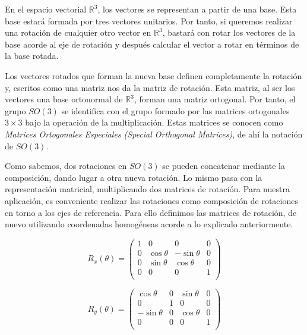 En el espacio vectorial $\mathbb{R}^3$, los vectores se representan a partir de
una base. Esta base estará formada por tres vectores unitarios. Por tanto, si
queremos realizar una rotación de cualquier otro vector en $\mathbb{R}^3$,
bastará con rotar los vectores de la base acorde al eje de rotación y después
calcular el vector a rotar en términos de la base rotada. 

Los vectores rotados que forman la nueva base definen completamente la rotación
y, escritos como una matriz nos da la matriz de rotación. Esta matriz, al ser
los vectores una base ortonormal de $\mathbb{R}^3$, forman una matriz ortogonal.
Por tanto, el grupo $SO(3)$ se identifica con el grupo formado por las matrices
ortogonales $3\times 3$ bajo la operación de la multiplicación. Estas matrices
se conocen como \textit{Matrices Ortogonales Especiales (Special Orthogonal
Matrices)}, de ahí la notación de $SO(3)$. 

Como sabemos, dos rotaciones en $SO(3)$ se pueden concatenar mediante la
composición, dando lugar a otra nueva rotación. Lo mismo pasa con la
representación matricial, multiplicando dos matrices de rotación. Para nuestra
aplicación, es conveniente realizar las rotaciones como composición de
rotaciones en torno a los ejes de referencia. Para ello definimos las matrices
de rotación, de nuevo utilizando coordenadas homogéneas acorde a lo explicado
anteriormente. 

\begin{equation}
	R_x(\theta) =
	\left(	
		\begin{array}{cccc}
			1 & 0 & 0 & 0 \\				
			0 & \cos{\theta} & -\sin{\theta} & 0 \\				
			0 & \sin{\theta} & \cos{\theta} & 0 \\				
			0 & 0 & 0 & 1 \\				
		\end{array}
	\right)
\end{equation}

\begin{equation}
	R_y(\theta) =
	\left(	
		\begin{array}{cccc}
			\cos{\theta} & 0 & \sin{\theta} & 0 \\				
			0 & 1 & 0 & 0 \\				
			-\sin{\theta} & 0 & \cos{\theta} & 0 \\				
			0 & 0 & 0 & 1 \\				
		\end{array}
	\right)
\end{equation}

